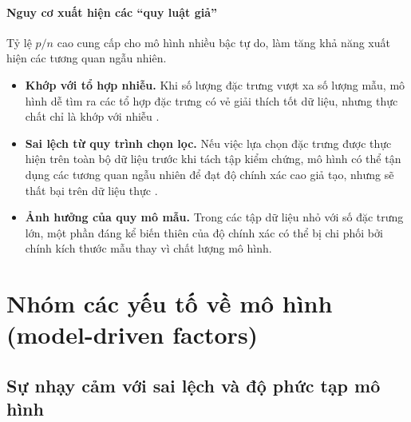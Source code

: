 \paragraph{Nguy cơ xuất hiện các ``quy luật giả''}

Tỷ lệ $p/n$ cao cung cấp cho mô hình nhiều bậc tự do, làm tăng khả năng xuất hiện các tương quan ngẫu nhiên.

\begin{itemize}
    \item \textbf{Khớp với tổ hợp nhiễu.} Khi số lượng đặc trưng vượt xa số lượng mẫu, mô hình dễ tìm ra các tổ hợp đặc trưng có vẻ giải thích tốt dữ liệu, nhưng thực chất chỉ là khớp với nhiễu \cite[pp.~1,3]{Vabalas2019}.
    
    \item \textbf{Sai lệch từ quy trình chọn lọc.} Nếu việc lựa chọn đặc trưng được thực hiện trên toàn bộ dữ liệu trước khi tách tập kiểm chứng, mô hình có thể tận dụng các tương quan ngẫu nhiên để đạt độ chính xác cao giả tạo, nhưng sẽ thất bại trên dữ liệu thực \cite[p.~2, 12]{Vabalas2019}.
    
    \item \textbf{Ảnh hưởng của quy mô mẫu.} Trong các tập dữ liệu nhỏ với số đặc trưng lớn, một phần đáng kể biến thiên của độ chính xác có thể bị chi phối bởi chính kích thước mẫu thay vì chất lượng mô hình\cite[p.~7]{Vabalas2019}.
\end{itemize}




\section{Nhóm các yếu tố về mô hình (model-driven factors)}
\subsection{Sự nhạy cảm với sai lệch và độ phức tạp mô hình}

